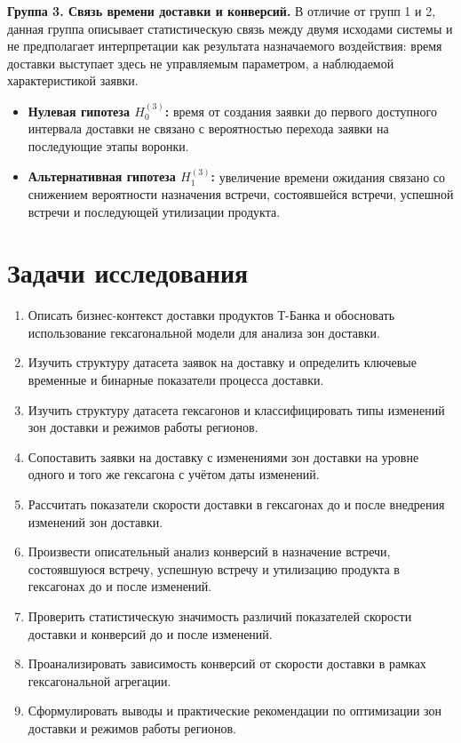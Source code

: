 \documentclass[14pt,a4paper]{extarticle}
\begin{document}
\textbf{Группа 3. Связь времени доставки и конверсий.}
В отличие от групп 1 и 2, данная группа описывает статистическую связь между двумя исходами системы и не предполагает интерпретации как результата назначаемого воздействия: время доставки выступает здесь не управляемым параметром, а наблюдаемой характеристикой заявки.
\begin{itemize}
    \item \textbf{Нулевая гипотеза $H^{(3)}_0$:} время от создания заявки до первого доступного интервала доставки не связано с вероятностью перехода заявки на последующие этапы воронки.
    \item \textbf{Альтернативная гипотеза $H^{(3)}_1$:} увеличение времени ожидания связано со снижением вероятности назначения встречи, состоявшейся встречи, успешной встречи и последующей утилизации продукта.
\end{itemize}

\section{Задачи исследования}
\begin{enumerate}
    \item Описать бизнес-контекст доставки продуктов Т-Банка и обосновать использование гексагональной модели для анализа зон доставки.
    \item Изучить структуру датасета заявок на доставку и определить ключевые временные и бинарные показатели процесса доставки.
    \item Изучить структуру датасета гексагонов и классифицировать типы изменений зон доставки и режимов работы регионов.
    \item Сопоставить заявки на доставку с изменениями зон доставки на уровне одного и того же гексагона с учётом даты изменений.
    \item Рассчитать показатели скорости доставки в гексагонах до и после внедрения изменений зон доставки.
    \item Произвести описательный анализ конверсий в назначение встречи, состоявшуюся встречу, успешную встречу и утилизацию продукта в гексагонах до и после изменений.
    \item Проверить статистическую значимость различий показателей скорости доставки и конверсий до и после изменений.
    \item Проанализировать зависимость конверсий от скорости доставки в рамках гексагональной агрегации.
    \item Сформулировать выводы и практические рекомендации по оптимизации зон доставки и режимов работы регионов.
\end{enumerate}
\end{document}
